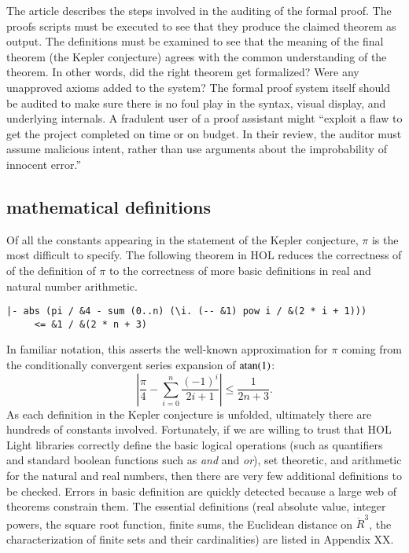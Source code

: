 The article \cite{XX-Adams} describes the steps involved in the
auditing of the formal proof.  The proofs scripts must be executed to
see that they produce the claimed theorem as output.  The definitions
must be examined to see that the meaning of the final theorem (the
Kepler conjecture) agrees with the common understanding of the
theorem.  In other words, did the right theorem get formalized?  Were
any unapproved axioms added to the system?  The formal proof system
itself should be audited to make sure there is no foul play in the
syntax, visual display, and underlying internals.  A fradulent user of
a proof assistant might ``exploit a flaw to get the project completed
on time or on budget.  In their review, the auditor must assume
malicious intent, rather than use arguments about the improbability of
innocent error.''

\subsection{mathematical definitions}

Of all the constants appearing in the statement of the Kepler
conjecture, $\pi$ is the most difficult to specify.  The following
theorem in HOL reduces the correctness of of the definition of $\pi$
to the correctness of more basic definitions in real and natural
number arithmetic.

\begin{obeylines}

\begin{verbatim}
|- abs (pi / &4 - sum (0..n) (\i. (-- &1) pow i / &(2 * i + 1))) 
     <= &1 / &(2 * n + 3)
\end{verbatim}

\end{obeylines}

In familiar notation, this asserts the well-known approximation for $\pi$ coming from the conditionally convergent
series expansion of  ${\operatorname{atan}}(1)$:
\[
   \left| \frac{\pi}{4} - \sum_{i=0}^n \frac { (-1)^i } { 2 i + 1} \right | \le \frac {1} {2 n + 3}.
\]
As each definition in the Kepler conjecture is unfolded, ultimately there are hundreds of constants involved.
Fortunately, if we are willing to trust that HOL Light libraries correctly define the basic logical operations (such as quantifiers and
standard boolean functions such as {\it and} and {\it or}),  set theoretic, and arithmetic for the natural and real numbers, then
there are very few additional definitions to be checked.  Errors in basic definition are quickly detected because a large
web of theorems constrain them.
The essential definitions (real absolute value, integer powers, the square root function, finite sums,
the Euclidean distance on $\ring{R}^3$,  the characterization of finite sets and their cardinalities) are listed in Appendix XX.

